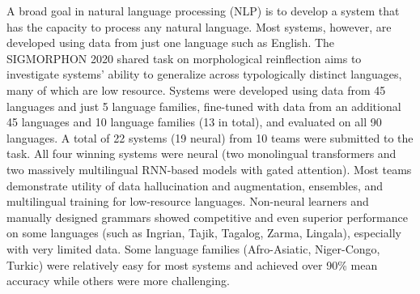 A broad goal in natural language processing (NLP) is to develop a system that has the capacity to process any natural language. Most systems, however, are developed using data from just one language such as English. The SIGMORPHON 2020 shared task on morphological reinflection aims to investigate systems' ability to generalize across typologically distinct languages, many of which are low resource. Systems were developed using data from 45 languages and just 5 language families, fine-tuned with data from an additional 45 languages and 10 language families (13 in total), and evaluated on all 90 languages. A total of 22 systems (19 neural) from 10 teams were submitted to the task. All four winning systems were neural (two monolingual transformers and two massively multilingual RNN-based models with gated attention). Most teams demonstrate utility of data hallucination and augmentation, ensembles, and multilingual training for low-resource languages. Non-neural learners and manually designed grammars showed competitive and even superior performance on some languages (such as Ingrian, Tajik, Tagalog, Zarma, Lingala), especially with very limited data. Some language families (Afro-Asiatic, Niger-Congo, Turkic) were relatively easy for most systems and achieved over 90\%  mean accuracy while others were more challenging.
